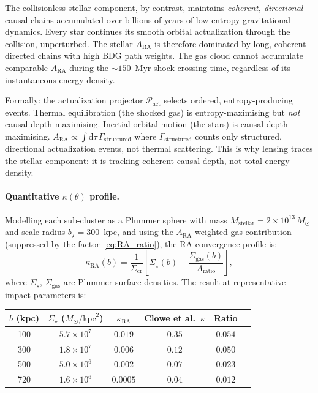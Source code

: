 \documentclass[11pt,a4paper]{article}
\theoremstyle{plain}
\theoremstyle{definition}
\theoremstyle{remark}
\begin{document}
The collisionless stellar component, by contrast, maintains
\emph{coherent, directional} causal chains accumulated over billions
of years of low-entropy gravitational dynamics. Every star continues
its smooth orbital actualization through the collision, unperturbed.
The stellar $A_{\mathrm{RA}}$ is therefore dominated by long,
coherent directed chains with high BDG path weights. The gas cloud
cannot accumulate comparable $A_{\mathrm{RA}}$ during the
$\sim 150$~Myr shock crossing time, regardless of its instantaneous
energy density.

Formally: the actualization projector $\mathcal{P}_{\mathrm{act}}$
selects ordered, entropy-producing events. Thermal equilibration (the
shocked gas) is entropy-maximising but \emph{not} causal-depth
maximising. Inertial orbital motion (the stars) is causal-depth
maximising. $A_{\mathrm{RA}} \propto \int \mathrm{d}\tau\,\Gamma_{\mathrm{structured}}$
where $\Gamma_{\mathrm{structured}}$ counts only structured, directional
actualization events, not thermal scattering. This is why lensing
traces the stellar component: it is tracking coherent causal depth,
not total energy density.

\paragraph{Quantitative $\kappa(\theta)$ profile.}
Modelling each sub-cluster as a Plummer sphere with mass
$M_{\mathrm{stellar}} = 2\times10^{13}\,M_\odot$ and scale radius
$b_\star = 300$~kpc, and using the $A_{\mathrm{RA}}$-weighted gas
contribution (suppressed by the factor~\eqref{eq:RA_ratio}),
the RA convergence profile is:
\begin{equation}
  \kappa_{\mathrm{RA}}(b)
  = \frac{1}{\Sigma_{\mathrm{cr}}}
    \left[\Sigma_\star(b) + \frac{\Sigma_{\mathrm{gas}}(b)}{A_{\mathrm{ratio}}}\right],
\end{equation}
where $\Sigma_\star$, $\Sigma_{\mathrm{gas}}$ are Plummer surface densities.
The result at representative impact parameters is:

\begin{center}
\renewcommand{\arraystretch}{1.20}
\begin{tabular}{cccccc}
\toprule
$b$ (kpc) & $\Sigma_\star$ ($M_\odot/\mathrm{kpc}^2$)
          & $\kappa_{\mathrm{RA}}$ & Clowe et al.\ $\kappa$ & Ratio \\
\midrule
100 & $5.7\times10^7$ & $0.019$ & $0.35$ & $0.054$ \\
300 & $1.8\times10^7$ & $0.006$ & $0.12$ & $0.050$ \\
500 & $5.0\times10^6$ & $0.002$ & $0.07$ & $0.023$ \\
720 & $1.6\times10^6$ & $0.0005$ & $0.04$ & $0.012$ \\
\bottomrule
\end{tabular}
\end{center}
\end{document}

